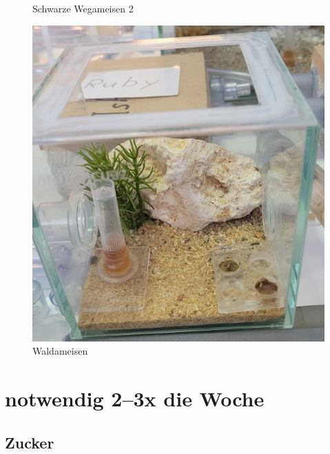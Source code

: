 \begin{figure}[H]
\begin{minipage}{.5\textwidth}
    \caption[Wegameisen2]{Schwarze Wegameisen 2}
  \end{minipage}
\end{figure}
\begin{figure}[H]
  \begin{minipage}{.5\textwidth}
    \centering
    \includegraphics[width=.8\linewidth]{resources/F-rufibarbis.jpg}
    \caption[Waldameisen]{Waldameisen}
  \end{minipage}%
  \begin{minipage}{.5\textwidth}
  \end{minipage}
\end{figure}

\section{notwendig 2--3x die Woche}

\subsection{Zucker}\label{sec:Ameisen_sub:Zucker}

